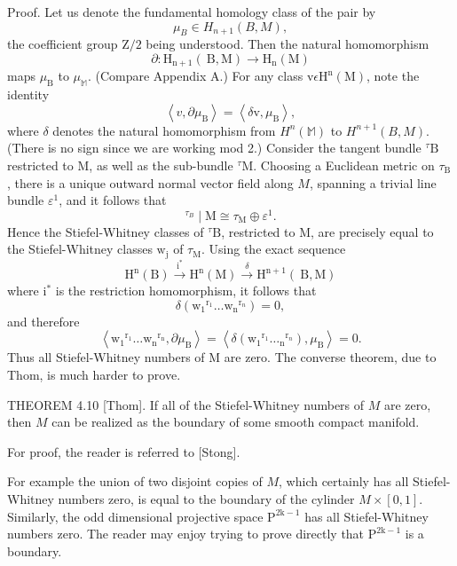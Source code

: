 \documentclass[10pt]{article}
\begin{document}
Proof. Let us denote the fundamental homology class of the pair by
$$
\mu_{B} \in H_{n+1}(B, M),
$$
the coefficient group $\mathrm{Z} / 2$ being understood. Then the natural homomorphism
$$
\partial: \mathrm{H}_{\mathrm{n}+1}(\mathrm{~B}, \mathrm{M}) \rightarrow \mathrm{H}_{\mathrm{n}}(\mathrm{M})
$$
maps $\mu_{\mathrm{B}}$ to $\mu_{\mathbb{M}}$. (Compare Appendix A.) For any class $\mathrm{v} \epsilon \mathrm{H}^{\mathrm{n}}(\mathrm{M})$, note the identity
$$
\left\langle v, \partial \mu_{\mathrm{B}}\right\rangle=\left\langle\delta \mathrm{v}, \mu_{\mathrm{B}}\right\rangle,
$$
where $\delta$ denotes the natural homomorphism from $H^{n}(\mathbb{M})$ to $H^{n+1}(B, M)$. (There is no sign since we are working mod 2.) Consider the tangent bundle ${ }^{\tau} \mathrm{B}$ restricted to $\mathrm{M}$, as well as the sub-bundle ${ }^{\tau} \mathrm{M}$. Choosing a Euclidean metric on $\tau_{\mathrm{B}}$, there is a unique outward normal vector field along $M$, spanning a trivial line bundle $\varepsilon^{1}$, and it follows that
$$
{ }^{\tau_{B}} \mid \mathrm{M} \cong \tau_{\mathrm{M}} \oplus \varepsilon^{1} .
$$
Hence the Stiefel-Whitney classes of ${ }^{\tau} \mathrm{B}$, restricted to $\mathrm{M}$, are precisely equal to the Stiefel-Whitney classes $\mathrm{w}_{\mathrm{j}}$ of $\tau_{\mathrm{M}}$. Using the exact sequence
$$
\mathrm{H}^{\mathrm{n}}(\mathrm{B}) \stackrel{\mathrm{i}^{*}}{\longrightarrow} \mathrm{H}^{\mathrm{n}}(\mathrm{M}) \stackrel{\delta}{\longrightarrow} \mathrm{H}^{\mathrm{n}+1}(\mathrm{~B}, \mathrm{M})
$$
where $\mathrm{i}^{*}$ is the restriction homomorphism, it follows that
$$
\delta\left(\mathrm{w}_{1}{ }^{\mathrm{r}_{1}} \ldots \mathrm{w}_{\mathrm{n}}{ }^{\mathrm{r}_{n}}\right)=0,
$$
and therefore
$$
\left\langle\mathrm{w}_{1}{ }^{\mathrm{r}_{1}} \ldots \mathrm{w}_{\mathrm{n}}{ }^{\mathrm{r}_{\mathrm{n}}}, \partial \mu_{\mathrm{B}}\right\rangle=\left\langle\delta\left(\mathrm{w}_{1}{ }^{\mathrm{r}_{1}} \ldots{ }_{\mathrm{n}}{ }^{\mathrm{r}_{n}}\right), \mu_{\mathrm{B}}\right\rangle=0 .
$$
Thus all Stiefel-Whitney numbers of M are zero. The converse theorem, due to Thom, is much harder to prove.

THEOREM 4.10 [Thom]. If all of the Stiefel-Whitney numbers of $M$ are zero, then $M$ can be realized as the boundary of some smooth compact manifold.

For proof, the reader is referred to [Stong].

For example the union of two disjoint copies of $M$, which certainly has all Stiefel-Whitney numbers zero, is equal to the boundary of the cylinder $M \times[0,1]$. Similarly, the odd dimensional projective space $\mathrm{P}^{2 \mathrm{k}-1}$ has all Stiefel-Whitney numbers zero. The reader may enjoy trying to prove directly that $\mathrm{P}^{2 \mathrm{k}-1}$ is a boundary.
\end{document}
